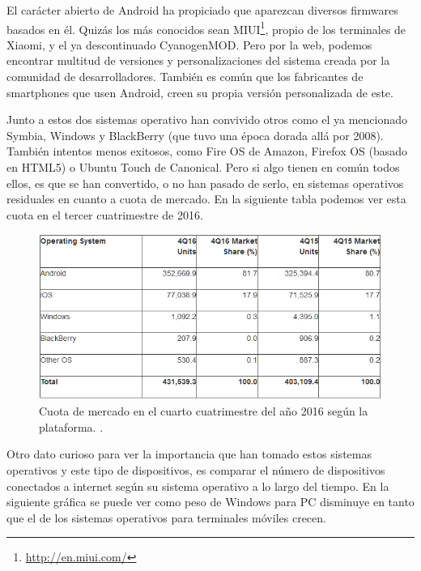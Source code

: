 El carácter abierto de Android ha propiciado que aparezcan diversos firmwares basados en él. Quizás los más conocidos sean MIUI\footnote{\url{http://en.miui.com/}}, propio de los terminales de Xiaomi, y el ya descontinuado CyanogenMOD. Pero por la web, podemos encontrar multitud de versiones y personalizaciones del sistema creada por la comunidad de desarrolladores. También es común que los fabricantes de smartphones que usen Android, creen su propia versión personalizada de este.

Junto a estos dos sistemas operativo han convivido otros como el ya mencionado Symbia, Windows y BlackBerry (que tuvo una época dorada allá por 2008). También intentos menos exitosos, como Fire OS de Amazon, Firefox OS (basado en HTML5) o Ubuntu Touch de Canonical. Pero si algo tienen en común todos ellos, es que se han convertido, o no han pasado de serlo, en sistemas operativos residuales en cuanto a cuota de mercado. En la siguiente tabla podemos ver esta cuota en el tercer cuatrimestre de 2016.

\begin{figure}[H]
\centering
  \includegraphics[width=\textwidth]{Figures/ch1/introduction/smartphone_sales_3q_2016}
  \caption{Cuota de mercado en el cuarto cuatrimestre del año 2016 según la plataforma. \cite{SmartPhonesSales}.}
\end{figure}

Otro dato curioso para ver la importancia que han tomado estos sistemas operativos y este tipo de dispositivos, es comparar el número de dispositivos conectados  a internet según su sistema operativo a lo largo del tiempo. En la siguiente gráfica se puede ver como peso de Windows para PC disminuye en tanto que el de los sistemas operativos para terminales móviles crecen.

